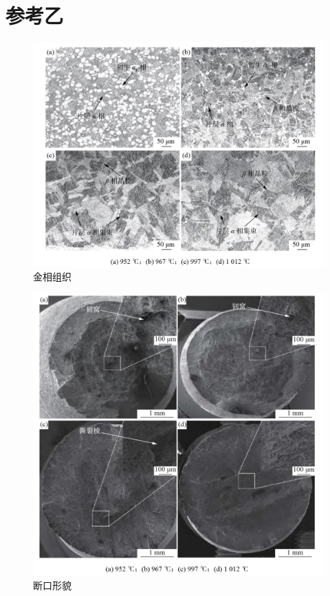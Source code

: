 
\section{参考乙}
\begin{table}[htbp]
	\centering
	\label{sec:my1HT}
	\caption{\ti 热处理工艺与性能汇总表\cite{RanXingGuRongWenDuDuiTi6Al4VELITaiHeJinXianWeiZuZhiJiXingNengDeYingXiang2021}}
\end{table}
\begin{figure}[h!]
	\centering
	\includegraphics[width=0.7\linewidth]{金相_乙}
	\caption{金相组织}
	\label{fig:}
\end{figure}
\begin{figure}[h!]
	\centering
	\includegraphics[width=0.7\linewidth]{断口_乙}
	\caption{断口形貌}
	\label{fig:}
\end{figure}

